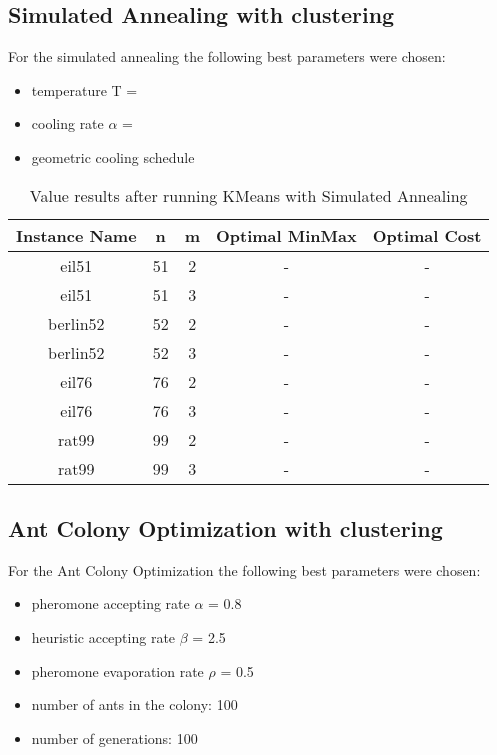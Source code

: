 \documentclass{article}
\begin{document}
\subsection{Simulated Annealing with clustering}
For the simulated annealing the following best parameters were chosen:
\begin{itemize}
  \item temperature T =
  \item cooling rate $\alpha$ = 
  \item geometric cooling schedule
\end{itemize}

\begin{table}[h!]
\centering
\begin{tabular}{ |c|c|c|c|c| } 
\hline
Instance Name & n & m & Optimal MinMax & Optimal Cost\\
\hline
eil51 & 51 & 2 & - & - \\ 
eil51 & 51 & 3 & - & - \\ 
berlin52 & 52 & 2 & - & - \\ 
berlin52 & 52 & 3 & - & - \\ 
eil76 & 76 & 2 & - & - \\ 
eil76 & 76 & 3 & - & - \\ 
rat99 & 99 & 2 & - & - \\ 
rat99 & 99 & 3 & - & - \\ 
\hline
\end{tabular}
\caption{Value results after running KMeans with Simulated Annealing}
\label{table:1}
\end{table}

\subsection{Ant Colony Optimization with clustering}
For the Ant Colony Optimization the following best parameters were chosen:
\begin{itemize}
  \item pheromone accepting rate $\alpha$ = 0.8
  \item heuristic accepting rate $\beta$ = 2.5
  \item pheromone evaporation rate $\rho$ = 0.5
  \item number of ants in the colony: 100
  \item number of generations: 100
\end{itemize}
\end{document}
